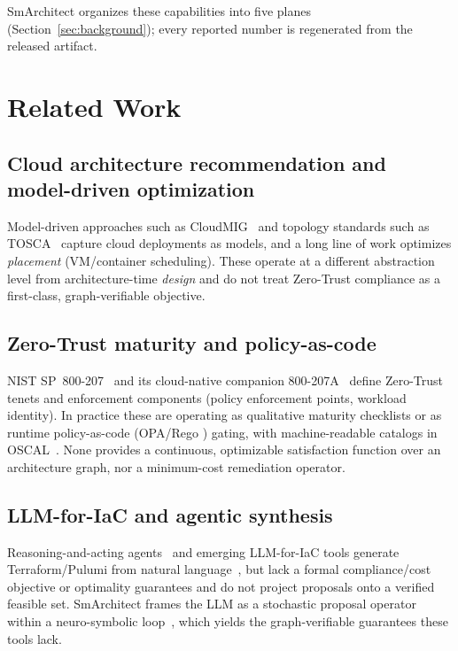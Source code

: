 \documentclass[journal]{IEEEtran}
\theoremstyle{plain}
\theoremstyle{definition}
\begin{document}
SmArchitect organizes these capabilities into five planes (Section~\ref{sec:background});
every reported number is regenerated from the released artifact.

\section{Related Work}\label{sec:related}

\subsection{Cloud architecture recommendation and model-driven optimization}
Model-driven approaches such as CloudMIG~\cite{frey2011cloudmig} and topology
standards such as TOSCA~\cite{tosca2013} capture cloud deployments as models,
and a long line of work optimizes \emph{placement} (VM/container scheduling).
These operate at a different abstraction level from architecture-time
\emph{design} and do not treat Zero-Trust compliance as a first-class,
graph-verifiable objective.

\subsection{Zero-Trust maturity and policy-as-code}
NIST SP~800-207~\cite{nist800207} and its cloud-native companion
800-207A~\cite{nist800207a} define Zero-Trust tenets and enforcement components
(policy enforcement points, workload identity). In practice these are operating
as qualitative maturity checklists or as runtime policy-as-code (OPA/Rego
\cite{opa}) gating, with machine-readable catalogs in OSCAL~\cite{oscal}. None
provides a continuous, optimizable satisfaction function over an architecture
graph, nor a minimum-cost remediation operator.

\subsection{LLM-for-IaC and agentic synthesis}
Reasoning-and-acting agents~\cite{yao2023react} and emerging LLM-for-IaC tools
generate Terraform/Pulumi from natural language~\cite{llmiac2024}, but lack a
formal compliance/cost objective or optimality guarantees and do not project
proposals onto a verified feasible set. SmArchitect frames the LLM as a stochastic
proposal operator within a neuro-symbolic loop~\cite{garcez2023neurosymbolic},
which yields the graph-verifiable guarantees these tools lack.
\end{document}
